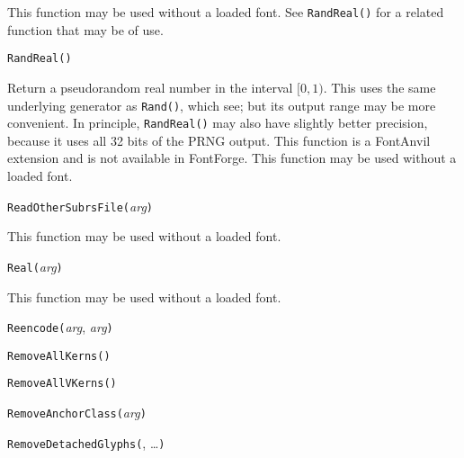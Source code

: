 This function may be used without a loaded font.  See \texttt{RandReal()}
for a related function that may be of use.



\texttt{RandReal()}

Return a pseudorandom real number in the interval $[0,1)$.  This uses the
same underlying generator as \texttt{Rand()}, which see; but its output
range may be more convenient.  In principle, \texttt{RandReal()} may also
have slightly better precision, because it uses all 32 bits of the PRNG
output.  This \FFdiff function is a FontAnvil extension and is not available
in FontForge.  This function may be used without a loaded font.



\texttt{ReadOtherSubrsFile(}\textit{arg}\texttt{)}

This function may be used without a loaded font.



\texttt{Real(}\textit{arg}\texttt{)}

This function may be used without a loaded font.



\texttt{Reencode(}\textit{arg}, \textit{arg}\texttt{)}



\texttt{RemoveAllKerns(}\texttt{)}



\texttt{RemoveAllVKerns(}\texttt{)}



\texttt{RemoveAnchorClass(}\textit{arg}\texttt{)}



\texttt{RemoveDetachedGlyphs(}, \ldots\texttt{)}

